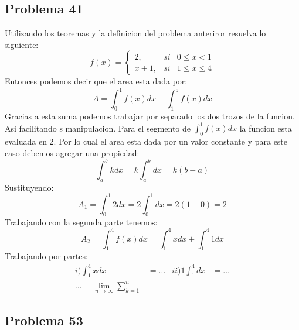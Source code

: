 \documentclass{article}
\begin{document}
      \subsection{Problema 41}
        Utilizando los teoremas y la definicion del problema anteriror resuelva lo siguiente:
        \begin{equation*}
          f(x) = \left\{
            \begin{array}{lcc}
              2, & si & 0\leq x < 1 \\
              x+1, & si & 1 \leq x \leq 4
            \end{array}
          \right.
        \end{equation*}
        Entonces podemos decir que el area esta dada por:
        \begin{equation}
          A = \int_{0}^{1} f(x)dx + \int_{1}^{5} f(x)dx
        \end{equation}
        Gracias a esta suma podemos trabajar por separado los dos trozos de la funcion. Asi facilitando s manipulacion.
        Para el segmento de $\int_{0}^{1}f(x)dx$ la funcion esta evaluada en 2. Por lo cual el area esta dada por un valor constante y para este caso debemos agregar una propiedad:
        \begin{equation}
          \int_{a}^{b}kdx = k\int_{a}^{b}dx = k(b-a)
        \end{equation}
        Sustituyendo:
        \begin{equation}
          A_1=\int_{0}^{1}2dx = 2\int_{0}^{1}dx = 2(1-0)=2
        \end{equation}
        Trabajando con la segunda parte tenemos:
        \begin{equation}
          A_2 = \int_{1}^{4} f(x)dx = \int_{1}^{4}xdx + \int_{1}^{4}1dx
        \end{equation}
        Trabajando por partes:
        \begin{align*}
          i) \int_{1}^{4}xdx&=\dots & ii) 1\int_{1}^{4}dx&= \dots \\ \dots=\lim_{n\to\infty} \sum_{k=1}^{n}
        \end{align*}
      \subsection{Problema 53}
\end{document}
